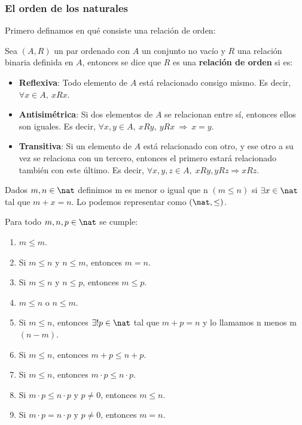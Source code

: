 \subsubsection{El orden de los naturales}
Primero definamos en qué consiste una relación de orden:
\begin{ndef}
    Sea $(A,R)$ un par ordenado con $A$ un conjunto no vacío y $R$ una relación binaria definida en $A$, entonces se dice que $R$ es una \textbf{relación de orden} si es:
    \begin{itemize}
        \item \textbf{Reflexiva}: Todo elemento de $A$ está relacionado consigo mismo. Es decir, $\forall x\in A,\ xRx$.
        \item \textbf{Antisimétrica}: Si dos elementos de $A$ se relacionan entre sí, entonces ellos son iguales. Es decir, $\forall x,y\in A,\ xRy,\ yRx \ \Rightarrow \ x=y$.
        \item \textbf{Transitiva}: Si un elemento de $A$ está relacionado con otro, y ese otro a su vez se relaciona con un tercero, entonces el primero estará relacionado también con este último. Es decir, $\forall x,y,z\in A,\;xRy,yRz\Rightarrow xRz$.
    \end{itemize}
\end{ndef}
\begin{ndef}[Orden]
    Dados $m,n \in \nat$ definimos m es menor o igual que n $(m \leq n)$ si $\exists x \in \nat$ tal que $m + x = n$. Lo podemos representar como $(\nat,\leq)$.
\end{ndef}

\begin{properties}
    Para todo $m,n,p \in \nat$ se cumple:
    \begin{enumerate}
        \item $m \leq m$.
        \item Si $m \leq n$ y $n \leq m$, entonces $m = n$.
        \item Si $m \leq n$ y $n \leq p$, entonces $m \leq p$.
        \item $m \leq n$ o $n \leq m$.
        \item Si $m \leq n$, entonces $\exists! p \in \nat$ tal que $m + p = n$ y lo llamamos n menos m $(n - m)$.
        \item Si $m \leq n$, entonces $m + p \leq n + p$.
        \item Si $m \leq n$, entonces $m \cdot p \leq n \cdot p$.
        \item Si $m \cdot p \leq n \cdot p$ y $p \neq 0$, entonces $m \leq n$.
        \item Si $m \cdot p = n \cdot p$ y $p \neq 0$, entonces $m = n$.
    \end{enumerate}
\end{properties}

